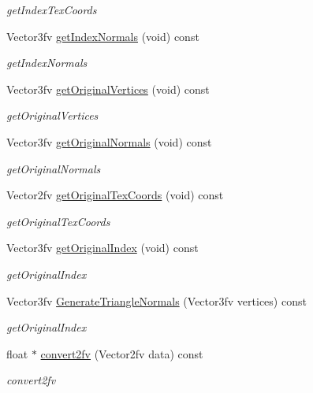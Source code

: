 \begin{DoxyCompactItemize}
\begin{DoxyCompactList}\small\item\em get\+Index\+Tex\+Coords \end{DoxyCompactList}\item 
Vector3fv \hyperlink{classEngine_1_1MeshData_a6f0bce28267f02e0c34d11b7687fe0be}{get\+Index\+Normals} (void) const 
\begin{DoxyCompactList}\small\item\em get\+Index\+Normals \end{DoxyCompactList}\item 
Vector3fv \hyperlink{classEngine_1_1MeshData_aafbb445af15c51bb2faa3f0c6a3c0723}{get\+Original\+Vertices} (void) const 
\begin{DoxyCompactList}\small\item\em get\+Original\+Vertices \end{DoxyCompactList}\item 
Vector3fv \hyperlink{classEngine_1_1MeshData_a3c212f964ee82ed741fdf750db3374d1}{get\+Original\+Normals} (void) const 
\begin{DoxyCompactList}\small\item\em get\+Original\+Normals \end{DoxyCompactList}\item 
Vector2fv \hyperlink{classEngine_1_1MeshData_a6f380528398deb5f1ba4a8e626feb7ec}{get\+Original\+Tex\+Coords} (void) const 
\begin{DoxyCompactList}\small\item\em get\+Original\+Tex\+Coords \end{DoxyCompactList}\item 
Vector3fv \hyperlink{classEngine_1_1MeshData_ad754c16d480339b42b04345a3eb018e0}{get\+Original\+Index} (void) const 
\begin{DoxyCompactList}\small\item\em get\+Original\+Index \end{DoxyCompactList}\item 
Vector3fv \hyperlink{classEngine_1_1MeshData_a955eea793e5e6bed6944c58b8e143473}{Generate\+Triangle\+Normals} (Vector3fv vertices) const 
\begin{DoxyCompactList}\small\item\em get\+Original\+Index \end{DoxyCompactList}\item 
float $\ast$ \hyperlink{classEngine_1_1MeshData_a88ded95a5faa7f2b2c8af72d886be5b4}{convert2fv} (Vector2fv data) const 
\begin{DoxyCompactList}\small\item\em convert2fv \end{DoxyCompactList}\item 

\end{DoxyCompactItemize}
